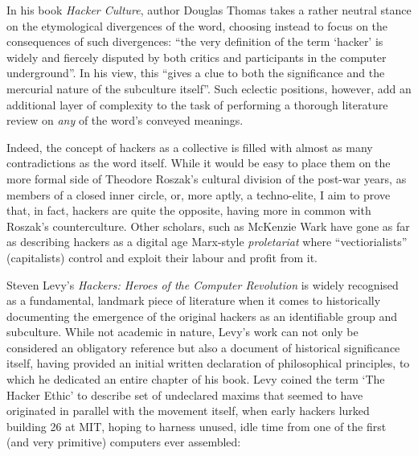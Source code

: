 In his book \textit{Hacker Culture}, author Douglas Thomas \citeyearpar{thomas02} takes a rather neutral stance on the etymological divergences of the word, choosing instead to focus on the consequences of such divergences: ``the very definition of the term `hacker' is widely and fiercely disputed by both critics and participants in the computer underground''. In his view, this ``gives a clue to both the significance and the mercurial nature of the subculture itself''. Such eclectic positions, however, add an additional layer of complexity to the task of performing a thorough literature review on \textit{any} of the word's conveyed meanings.

Indeed, the concept of hackers as a collective is filled with almost as many contradictions as the word itself. While it would be easy to place them on the more formal side of Theodore Roszak's \citeyearpar{roszak69} cultural division of the post-war years, as members of a closed inner circle, or, more aptly, a techno-elite, I aim to prove that, in fact, hackers are quite the opposite, having more in common with Roszak's counterculture. Other scholars, such as McKenzie Wark \citeyearpar{wark04} have gone as far as describing hackers as a digital age Marx-style \textit{proletariat} where ``vectiorialists'' (capitalists) control and exploit their labour and profit from it.

Steven Levy's \textit{Hackers: Heroes of the Computer Revolution} \citeyearpar{levy84} is widely recognised as a fundamental, landmark piece of literature when it comes to historically documenting the emergence of the original hackers as an identifiable group and subculture. While not academic in nature, Levy's work can not only be considered an obligatory reference but also a document of historical significance itself, having provided an initial written declaration of philosophical principles, to which he dedicated an entire chapter of his book. Levy coined the term `The Hacker Ethic' to describe set of undeclared maxims that seemed to have originated in parallel with the movement itself, when early hackers lurked building 26 at MIT, hoping to harness unused, idle time from one of the first (and very primitive) computers ever assembled:



